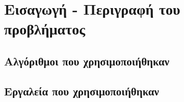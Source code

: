 \chapter{Εισαγωγή - Περιγραφή του προβλήματος}

\section{Αλγόριθμοι που χρησιμοποιήθηκαν}
\section{Εργαλεία που χρησιμοποιήθηκαν}